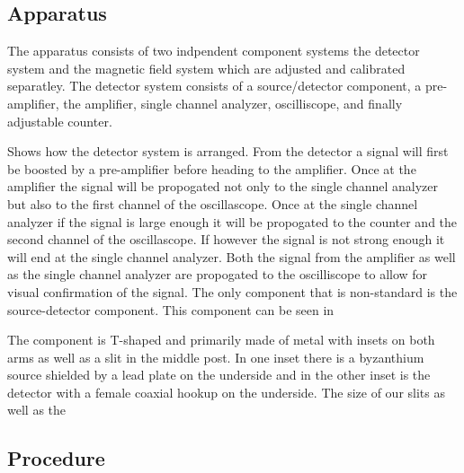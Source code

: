 \subsection{Apparatus}
\indent The apparatus consists of two indpendent component systems the detector system and the magnetic field system which are adjusted and calibrated separatley.  The detector system consists of a source/detector component, a pre-amplifier, the amplifier, single channel analyzer, oscilliscope, and finally adjustable counter.


Shows how the detector system is arranged.  From the detector a signal will first be boosted by a pre-amplifier before heading to the amplifier. Once at the amplifier the signal will be propogated not only to the single channel analyzer but also to the first channel of the  oscillascope.  Once at the single channel analyzer if the signal is large enough it will be propogated to the counter and the second channel of the oscillascope. If however the signal is not strong enough it will end at the single channel analyzer. Both the signal from the amplifier as well as the single channel analyzer are propogated to the oscilliscope to allow for visual confirmation of the signal.  
\indent The only component that is non-standard is the source-detector component.  This component can be seen in
 

The component is T-shaped and primarily made of metal with insets on both arms as well as a slit in the middle post.  In one inset there is a byzanthium source shielded by a lead plate on the underside and in the other inset is the detector with a female coaxial hookup on the underside.  The size of our slits as well as the    

 
\subsection{Procedure}

